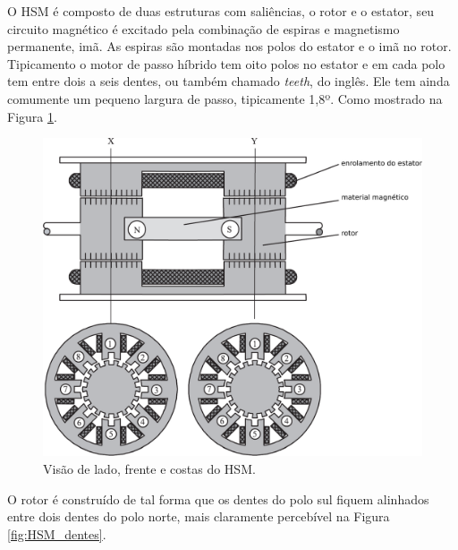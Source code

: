O HSM é composto de duas estruturas com saliências, o rotor e o estator, seu circuito magnético é excitado pela combinação de espiras e magnetismo permanente, imã. As espiras são montadas nos polos do estator e o imã no rotor. Tipicamento o motor de passo híbrido tem oito polos no estator e em cada polo tem entre dois a seis dentes, ou também chamado \emph{teeth}, do inglês. Ele tem ainda comumente um pequeno largura de passo, tipicamente 1,8º. Como mostrado na Figura \ref{fig:estrutura_HSM}. \cite{SteppingBook}

\begin{figure}[H]
	\centering
	\includegraphics[width = \columnwidth]{Images/estrutura_HSM.pdf}
	\caption{Visão de lado, frente e costas do HSM. \cite{SteppingBook}}
	\label{fig:estrutura_HSM}
\end{figure}

O rotor é construído de tal forma que os dentes do polo sul fiquem alinhados entre dois dentes do polo norte, mais claramente percebível na Figura \ref{fig:HSM_dentes}.

